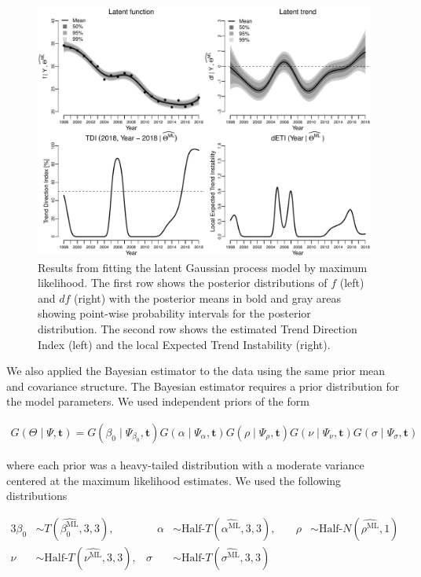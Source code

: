 \documentclass[11pt,]{article}
\theoremstyle{nonumberplain}
\begin{document}
\begin{figure}[htb]
\center\includegraphics{../figures/likFitPlot}
\caption{Results from fitting the latent Gaussian process model by maximum likelihood. The first row shows the posterior distributions of $f$ (left) and $df$ (right) with the posterior means in bold and gray areas showing point-wise probability intervals for the posterior distribution. The second row shows the estimated Trend Direction Index (left) and the local Expected Trend Instability (right).}
\label{fig:likFitPlot}
\end{figure}

We also applied the Bayesian estimator to the data using the same prior
mean and covariance structure. The Bayesian estimator requires a prior
distribution for the model parameters. We used independent priors of the
form

\begin{align*}
G(\Theta \mid \Psi, \mathbf{t}) = G(\beta_0 \mid \Psi_{\beta_0}, \mathbf{t})G(\alpha \mid \Psi_{\alpha}, \mathbf{t})G(\rho \mid \Psi_{\rho}, \mathbf{t})G(\nu \mid \Psi_{\nu}, \mathbf{t})G(\sigma \mid \Psi_{\sigma}, \mathbf{t})
\end{align*}

where each prior was a heavy-tailed distribution with a moderate
variance centered at the maximum likelihood estimates. We used the
following distributions

\begin{alignat*}{3}
 \beta_0 &\sim T\left(\widehat{\beta_0^\text{ML}}, 3, 3\right), &\quad \alpha &\sim \text{Half-}T\left(\widehat{\alpha^\text{ML}}, 3, 3\right), &\quad \rho &\sim \text{Half-}N\left(\widehat{\rho^\text{ML}}, 1\right)\\   
 \nu &\sim \text{Half-}T\left(\widehat{\nu^\text{ML}}, 3, 3\right), & \sigma &\sim \text{Half-}T\left(\widehat{\sigma^\text{ML}}, 3, 3\right)  & 
\end{alignat*}
\end{document}
